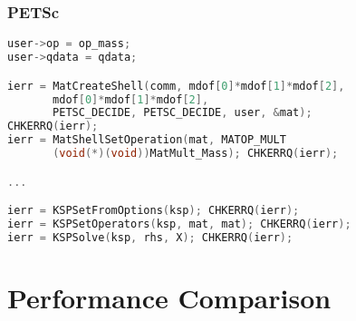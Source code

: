 \documentclass{beamer}
\begin{document}

\begin{frame}[fragile]
\begin{center}
\frametitle{PETSc}

{\small
\begin{lstlisting}[language=C]
user->op = op_mass;
user->qdata = qdata;

ierr = MatCreateShell(comm, mdof[0]*mdof[1]*mdof[2],
       mdof[0]*mdof[1]*mdof[2],
       PETSC_DECIDE, PETSC_DECIDE, user, &mat);
CHKERRQ(ierr);
ierr = MatShellSetOperation(mat, MATOP_MULT
       (void(*)(void))MatMult_Mass); CHKERRQ(ierr);

...

ierr = KSPSetFromOptions(ksp); CHKERRQ(ierr);
ierr = KSPSetOperators(ksp, mat, mat); CHKERRQ(ierr);
ierr = KSPSolve(ksp, rhs, X); CHKERRQ(ierr);
\end{lstlisting}
}

\end{center}
\end{frame}

\section{Performance Comparison}
\end{document}
